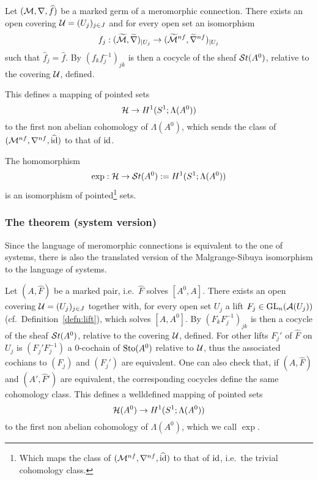 Let $(\mathcal{M},\nabla,\widehat f)$ be a marked germ of a  meromorphic connection.
There exists an open covering $\mathcal{U}=(U_j)_{j\in J}$ and for every open set an
isomorphism
\[
  f_j:(\widetilde{\mathcal{M}},\widetilde\nabla)_{|U_j}
  \to(\widetilde{\mathcal{M}}^{nf},\widetilde\nabla^{nf})_{|U_j}
\]
such that $\hat f_j=\hat f$. By $(f_kf_j^{-1})_{jk}$ is then a cocycle of the
sheaf $\mathcal{S}{}t(A^0)$, relative to the covering $\mathcal{U}$, defined.
\begin{comment}
  For other lifts $f_j'$ of $\hat f$ on $W_j$, $(f_j'f_j^{-1})$ is a
  $0$-cochain of $\Sto(A^0)$ relative to $\cU$. Thus the associated cochians to
  $(f_j)$ and $(f_j')$ are equivalent. One can also check that, if
  $(\cM,\nabla,\hat f)$ and $(\cM',\nabla',\hat f')$ are isomorphic, the
  corresponding cocycles define the same cohomology class.
\end{comment}
This defines a mapping of pointed sets
\[
  \mathcal{H}\to H^1(S^1;\Lambda(A^0))
\]
to the first non abelian cohomology of $\Lambda(A^0)$, which sends the class of
$(\mathcal{M}^{nf},\nabla^{nf},\widehat{\operatorname{id}})$ to that of $\operatorname{id}$.

\begin{tthm} \label{thm:mainThm1MeromVersion}
  The homomorphism
  \[
    \exp:\mathcal{H}\to\mathcal{S}{}t(A^0):=H^1(S^1;\Lambda(A^0))
  \]
  is an isomorphism of pointed\footnote{Which maps the class of
  $(\mathcal{M}^{nf},\nabla^{nf},\widehat{\operatorname{id}})$ to that of $\operatorname{id}$, i.e.\ the trivial
  cohomology class.} sets.
\end{tthm}

\subsubsection{The theorem (system version)}
Since the language of meromorphic connections is equivalent to the one of
systems, there is also the translated version of the Malgrange-Sibuya
isomorphism to the language of systems.

Let $(A,\hat F)$ be a marked pair, i.e.\ $\hat F$ solves $[A^0,A]$.
There exists an open covering $\mathcal{U}=(U_j)_{j\in J}$ together with, for every
open set $U_j$ a lift $F_j\in\operatorname{GL}_n(\mathcal{A}(U_j))$
(cf.\ Definition~\ref{defn:lift}), which solves $[A,A^0]$.
By $(F_kF_j^{-1})_{jk}$ is then a cocycle of the sheaf $\mathcal{S}{}t(A^0)$, relative to
the covering $\mathcal{U}$, defined.
For other lifts $F_j'$ of $\hat F$ on $U_j$ is $(F_j'F_j^{-1})$ a $0$-cochain
of $\operatorname{Sto}(A^0)$ relative to $\mathcal{U}$, thus the associated cochians to $(F_j)$ and
$(F_j')$ are equivalent.
One can also check that, if $(A,\hat F)$ and $(A',\hat F')$ are equivalent, the
corresponding cocycles define the same cohomology class.
This defines a welldefined mapping of pointed sets
\[
  \mathcal{H}(A^0)\to H^1(S^1;\Lambda(A^0))
\]
to the first non abelian cohomology of $\Lambda(A^0)$, which we call $\exp$.

